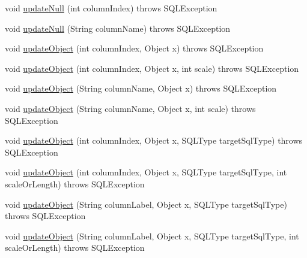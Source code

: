 \begin{DoxyCompactItemize}
\item 
void \mbox{\hyperlink{classcom_1_1mysql_1_1cj_1_1jdbc_1_1result_1_1_updatable_result_set_a42488030279d1a6c273045bec19ed373}{update\+Null}} (int column\+Index)  throws S\+Q\+L\+Exception 
\item 
void \mbox{\hyperlink{classcom_1_1mysql_1_1cj_1_1jdbc_1_1result_1_1_updatable_result_set_ae98e7a025f6d44f069cdd7a06805697a}{update\+Null}} (String column\+Name)  throws S\+Q\+L\+Exception 
\item 
void \mbox{\hyperlink{classcom_1_1mysql_1_1cj_1_1jdbc_1_1result_1_1_updatable_result_set_a01063e5c025c2d171406e0ec8605f755}{update\+Object}} (int column\+Index, Object x)  throws S\+Q\+L\+Exception 
\item 
void \mbox{\hyperlink{classcom_1_1mysql_1_1cj_1_1jdbc_1_1result_1_1_updatable_result_set_ab235e712d0c03c2a12ed4bdc2c90a54e}{update\+Object}} (int column\+Index, Object x, int scale)  throws S\+Q\+L\+Exception 
\item 
void \mbox{\hyperlink{classcom_1_1mysql_1_1cj_1_1jdbc_1_1result_1_1_updatable_result_set_a8dbd2409937a009e47b7d98524fd2d69}{update\+Object}} (String column\+Name, Object x)  throws S\+Q\+L\+Exception 
\item 
void \mbox{\hyperlink{classcom_1_1mysql_1_1cj_1_1jdbc_1_1result_1_1_updatable_result_set_a77b819dbee8b4636ab5b885dd2613d47}{update\+Object}} (String column\+Name, Object x, int scale)  throws S\+Q\+L\+Exception 
\item 
void \mbox{\hyperlink{classcom_1_1mysql_1_1cj_1_1jdbc_1_1result_1_1_updatable_result_set_a73bf4b782f6e4de1d3ce6ab8015d4e98}{update\+Object}} (int column\+Index, Object x, S\+Q\+L\+Type target\+Sql\+Type)  throws S\+Q\+L\+Exception 
\item 
void \mbox{\hyperlink{classcom_1_1mysql_1_1cj_1_1jdbc_1_1result_1_1_updatable_result_set_af5cd8ea155e9a738bc7d717526cb69c3}{update\+Object}} (int column\+Index, Object x, S\+Q\+L\+Type target\+Sql\+Type, int scale\+Or\+Length)  throws S\+Q\+L\+Exception 
\item 
void \mbox{\hyperlink{classcom_1_1mysql_1_1cj_1_1jdbc_1_1result_1_1_updatable_result_set_aca20d27ed3a2382009d56f0fa57483ce}{update\+Object}} (String column\+Label, Object x, S\+Q\+L\+Type target\+Sql\+Type)  throws S\+Q\+L\+Exception 
\item 
void \mbox{\hyperlink{classcom_1_1mysql_1_1cj_1_1jdbc_1_1result_1_1_updatable_result_set_a2557907ee4b44655c137b56708565db4}{update\+Object}} (String column\+Label, Object x, S\+Q\+L\+Type target\+Sql\+Type, int scale\+Or\+Length)  throws S\+Q\+L\+Exception 

\end{DoxyCompactItemize}
